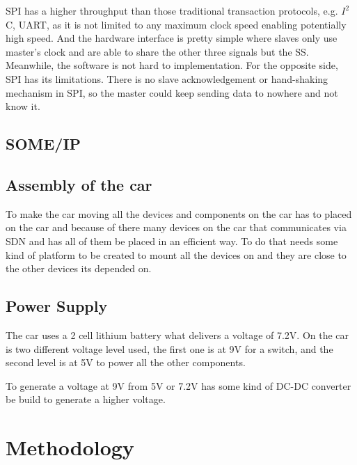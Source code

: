 \documentclass[11pt, titlepage]{article} %
\begin{document}
SPI has a higher throughput than those traditional transaction protocols, e.g. $I^{2}$C, UART, as it is not limited to any maximum clock speed enabling potentially high speed. And the hardware interface is pretty simple where slaves only use master's clock and are able to share the other three signals but the SS. Meanwhile, the software is not hard to implementation. For the opposite side, SPI has its limitations. There is no slave acknowledgement or hand-shaking mechanism in SPI, so the master could keep sending data to nowhere and not know it.

\subsection{SOME/IP}


\subsection{Assembly of the car}
To make the car moving all the devices and components on the car has to placed on the car and because of there many devices on the car that communicates via SDN and has all of them be placed in an efficient way. To do that needs some kind of platform to be created to mount all the devices on and they are close to the other devices its depended on. 


\subsection{Power Supply}
The car uses a 2 cell lithium battery what delivers a voltage of 7.2V. On the car is two different voltage level used, the first one is at 9V for a switch, and the second level is at 5V to power all the other components. 

To generate a voltage at 9V from 5V or 7.2V has some kind of DC-DC converter be build to generate a higher voltage. 


\clearpage
\section{Methodology}
\end{document}
